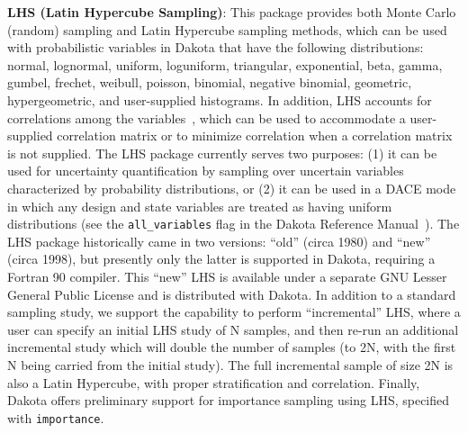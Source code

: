 \textbf{LHS (Latin Hypercube Sampling)}: This package provides both
Monte Carlo (random) sampling and Latin Hypercube sampling methods,
which can be used with probabilistic variables in Dakota that have the
following distributions: normal, lognormal, uniform, loguniform,
triangular, exponential, beta, gamma, gumbel, frechet, weibull, poisson, 
binomial, negative binomial, geometric, hypergeometric, and
user-supplied histograms. In addition, LHS accounts for correlations
among the variables~\cite{Ima84}, which can be used to accommodate a
user-supplied correlation matrix or to minimize correlation when a
correlation matrix is not supplied. The LHS package currently serves
two purposes: (1) it can be used for uncertainty quantification by
sampling over uncertain variables characterized by probability
distributions, or (2) it can be used in a DACE mode in which any
design and state variables are treated as having uniform distributions
(see the \texttt{all\_variables} flag in the Dakota Reference
Manual~\cite{RefMan}). The LHS package historically came in two
versions: ``old'' (circa 1980) and ``new'' (circa 1998), but presently
only the latter is supported in Dakota, requiring a Fortran 90
compiler.  This ``new'' LHS is available under a separate GNU Lesser
General Public License and is distributed with Dakota.  In addition 
to a standard sampling study, we support the capability to perform 
``incremental'' LHS, where a user can specify an initial LHS study 
of N samples, and then re-run an additional incremental study which 
will double the number of samples (to 2N, with the first N being 
carried from the initial study).  The full incremental sample of 
size 2N is also a Latin Hypercube, with proper stratification and 
correlation.  Finally, Dakota offers preliminary support for 
importance sampling using LHS, specified with \texttt{importance}.

